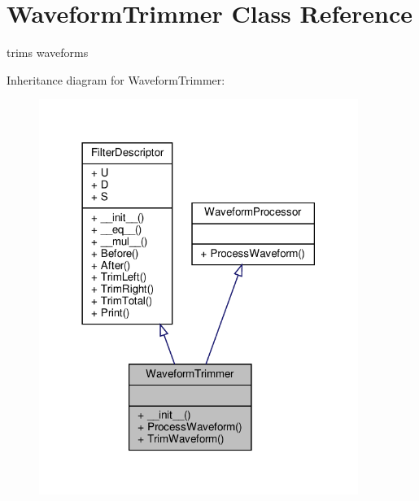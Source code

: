 \hypertarget{classSignalIntegrity_1_1TimeDomain_1_1Filters_1_1WaveformTrimmer_1_1WaveformTrimmer}{}\section{Waveform\+Trimmer Class Reference}
\label{classSignalIntegrity_1_1TimeDomain_1_1Filters_1_1WaveformTrimmer_1_1WaveformTrimmer}


trims waveforms  




Inheritance diagram for Waveform\+Trimmer\+:
\nopagebreak
\begin{figure}[H]
\begin{center}
\leavevmode
\includegraphics[width=294pt]{classSignalIntegrity_1_1TimeDomain_1_1Filters_1_1WaveformTrimmer_1_1WaveformTrimmer__inherit__graph}
\end{center}
\end{figure}


